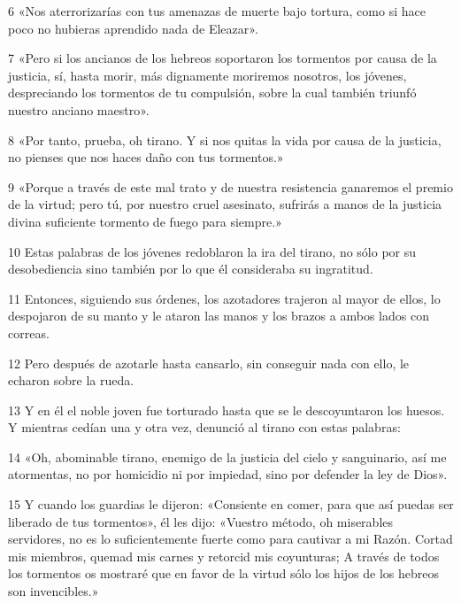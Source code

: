 \par 6 «Nos aterrorizarías con tus amenazas de muerte bajo tortura, como si hace poco no hubieras aprendido nada de Eleazar».

\par 7 «Pero si los ancianos de los hebreos soportaron los tormentos por causa de la justicia, sí, hasta morir, más dignamente moriremos nosotros, los jóvenes, despreciando los tormentos de tu compulsión, sobre la cual también triunfó nuestro anciano maestro».

\par 8 «Por tanto, prueba, oh tirano. Y si nos quitas la vida por causa de la justicia, no pienses que nos haces daño con tus tormentos.»

\par 9 «Porque a través de este mal trato y de nuestra resistencia ganaremos el premio de la virtud; pero tú, por nuestro cruel asesinato, sufrirás a manos de la justicia divina suficiente tormento de fuego para siempre.»

\par 10 Estas palabras de los jóvenes redoblaron la ira del tirano, no sólo por su desobediencia sino también por lo que él consideraba su ingratitud.

\par 11 Entonces, siguiendo sus órdenes, los azotadores trajeron al mayor de ellos, lo despojaron de su manto y le ataron las manos y los brazos a ambos lados con correas.

\par 12 Pero después de azotarle hasta cansarlo, sin conseguir nada con ello, le echaron sobre la rueda.

\par 13 Y en él el noble joven fue torturado hasta que se le descoyuntaron los huesos. Y mientras cedían una y otra vez, denunció al tirano con estas palabras:

\par 14 «Oh, abominable tirano, enemigo de la justicia del cielo y sanguinario, así me atormentas, no por homicidio ni por impiedad, sino por defender la ley de Dios».

\par 15 Y cuando los guardias le dijeron: «Consiente en comer, para que así puedas ser liberado de tus tormentos», él les dijo: «Vuestro método, oh miserables servidores, no es lo suficientemente fuerte como para cautivar a mi Razón. Cortad mis miembros, quemad mis carnes y retorcid mis coyunturas; A través de todos los tormentos os mostraré que en favor de la virtud sólo los hijos de los hebreos son invencibles.»


